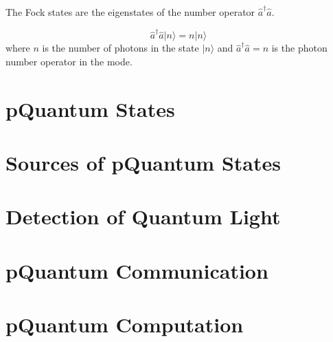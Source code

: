 \documentclass[
  letterpaper,
  DIV=11,
  numbers=noendperiod]{scrreprt}
\begin{document}
The Fock states are the eigenstates of the number operator
\(\hat{a}^\dagger \hat{a}\).

\[ \hat{a}^\dagger \hat{a} |n\rangle = n |n\rangle \] where \(n\) is the
number of photons in the state \(|n\rangle\) and
\(\hat{a}^\dagger \hat{a} = n\) is the photon number operator in the
mode.


\chapter*{pQuantum States}\label{pquantum-states}



\chapter*{Sources of pQuantum States}\label{sources-of-pquantum-states}



\chapter*{Detection of Quantum Light}\label{detection-of-quantum-light}



\chapter*{pQuantum Communication}\label{pquantum-communication}



\chapter*{pQuantum Computation}\label{pquantum-computation}
\end{document}
